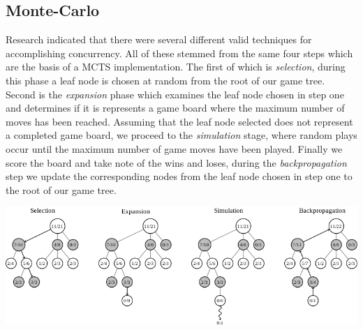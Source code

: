 \documentclass[conference]{IEEEtran}
\begin{document}
\subsection{Monte-Carlo}
Research indicated that there were several different valid techniques for accomplishing concurrency. All of these stemmed from the same four steps which are the basis of a MCTS implementation. The first of which is \textit{selection}, during this phase a leaf node is chosen at random from the root of our game tree. Second is the \textit{expansion} phase which examines the leaf node chosen in step one and determines if it is represents a game board where the maximum number of moves has been reached. Assuming that the leaf node selected does not represent a completed game board, we proceed to the \textit{simulation} stage, where random plays occur until the maximum number of game moves have been played. Finally we score the board and take note of the wins and loses, during the \textit{backpropagation} step we update the corresponding nodes from the leaf node chosen in step one to the root of our game tree.\par
\includegraphics{MCTS}
\end{document}

